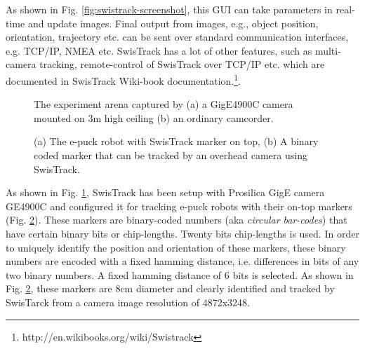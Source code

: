 As shown in Fig. \ref{fig:swistrack-screenshot}, this GUI can take parameters in real-time and update images. Final output from images, e.g., object position, orientation, trajectory etc. can be sent over standard communication interfaces, e.g. TCP/IP, NMEA etc. SwisTrack has a lot of other features, such as multi-camera tracking, remote-control of SwisTrack over TCP/IP etc. which are documented in SwisTrack Wiki-book documentation.\footnote{http://en.wikibooks.org/wiki/Swistrack}.

\begin{figure}[H]
\centering
\hspace*{1cm}
\newline
\centering
{}
\caption{The experiment arena captured by (a) a GigE4900C camera mounted on 3m high ceiling (b) an ordinary camcorder.}
\label{fig:expt-arena} %
\end{figure}
\begin{figure}[H]
\centering
{} 
\hspace{0.5cm}
\caption{(a) The e-puck robot with SwisTrack marker on top, (b) A binary coded marker that can be tracked by an overhead camera  using SwisTrack.}
\label{fig:e-puck}
\end{figure}
As shown in Fig. \ref{fig:expt-arena}, SwisTrack has been setup with  Prosilica GigE camera GE4900C and configured it for tracking e-puck robots with their on-top markers (Fig. \ref{fig:e-puck}). These markers are binary-coded numbers (aka {\em circular bar-codes}) that have certain binary bits or chip-lengths.  Twenty bits chip-lengths is used. In order to uniquely identify the position and orientation of these markers, these binary numbers are encoded with a fixed hamming distance, i.e. differences in bits of any two binary numbers. A fixed hamming distance of 6 bits is selected. As shown in Fig. \ref{fig:e-puck}, these markers are 8cm diameter and clearly identified and tracked by SwisTarck from a camera image resolution of 4872x3248. 

